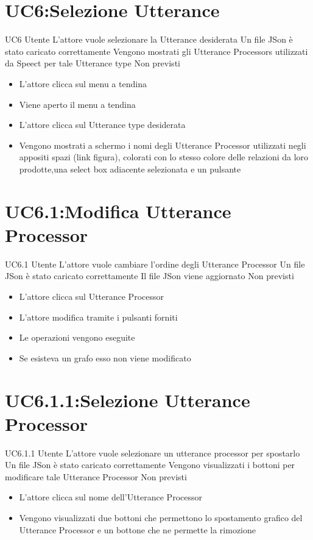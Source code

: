 \documentclass[../AnalisideiRequisiti.tex]{subfiles}
\begin{document}
\section{UC6:Selezione Utterance}
\UserCase
{UC6}
{Utente}
{}
{L'attore vuole selezionare la Utterance desiderata}
{Un file JSon è stato caricato  correttamente }
{Vengono mostrati gli Utterance Processors utilizzati da Speect per tale Utterance type}
{Non previsti}
{
	\begin{itemize}
		\item{} L'attore clicca sul menu a tendina
		\item{} Viene aperto il menu a tendina
		\item{} L'attore clicca sul Utterance type desiderata
		\item{} Vengono mostrati a schermo i nomi degli Utterance Processor utilizzati negli appositi spazi (link figura), colorati con lo stesso colore delle relazioni da loro prodotte,una select box adiacente selezionata e un pulsante
		
	\end{itemize}
}
\section{UC6.1:Modifica Utterance Processor}
\UserCase
{UC6.1}
{Utente}
{}
{L'attore vuole cambiare l'ordine degli Utterance Processor}
{Un file JSon è stato caricato  correttamente }
{Il file JSon viene aggiornato}
{Non previsti}
{
	\begin{itemize}
		\item{} L'attore clicca sul Utterance Processor 
		\item{} L'attore modifica tramite i pulsanti forniti	
		\item{} Le operazioni vengono eseguite
		\item{} Se esisteva un grafo esso non viene modificato
		
	\end{itemize}
}
\section{UC6.1.1:Selezione Utterance Processor}
\UserCase
{UC6.1.1}
{Utente}
{}
{L'attore vuole selezionare un utterance processor per spostarlo}
{Un file JSon è stato caricato  correttamente }
{Vengono visualizzati i bottoni per modificare tale Utterance Processor}
{Non previsti}
{
	\begin{itemize}
		\item{} L'attore clicca sul nome dell'Utterance Processor
		\item{} Vengono visualizzati due bottoni che permettono lo spostamento grafico del Utterance Processor e un bottone che ne permette la rimozione 
		
		
	\end{itemize}
}
\end{document}
